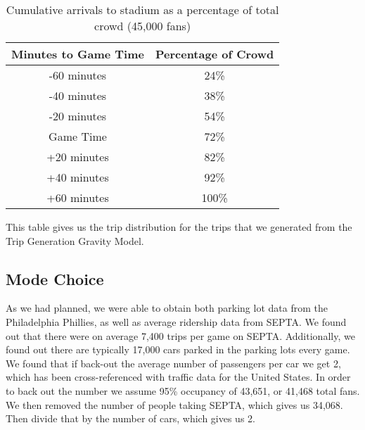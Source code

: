 \begin{table}
  \centering
  \begin{tabular}{cc}
    Minutes to Game Time & Percentage of Crowd \\
    \hline\hline
    -60 minutes & 24\% \\
    -40 minutes & 38\% \\
    -20 minutes & 54\% \\
     Game Time  & 72\% \\
    +20 minutes & 82\% \\
    +40 minutes & 92\% \\
    +60 minutes & 100\% \\
  \end{tabular}
  \caption{Cumulative arrivals to stadium as a percentage of total crowd (45,000 fans)}
  \label{tab-arrivals}
\end{table}

This table gives us the trip distribution for the trips that we generated from the Trip Generation Gravity Model.


\subsection{Mode Choice}

As we had planned, we were able to obtain both parking lot data from the Philadelphia Phillies, as well as average ridership data from SEPTA. We found out that there were on average 7,400 trips per game on SEPTA. Additionally, we found out there are typically 17,000 cars parked in the parking lots every game. We found that if back-out the average number of passengers per car we get 2, which has been cross-referenced with traffic data for the United States. In order to back out the number we assume 95\% occupancy of 43,651, or 41,468 total fans. We then removed the number of people taking SEPTA, which gives us 34,068. Then divide that by the number of cars, which gives us 2.


